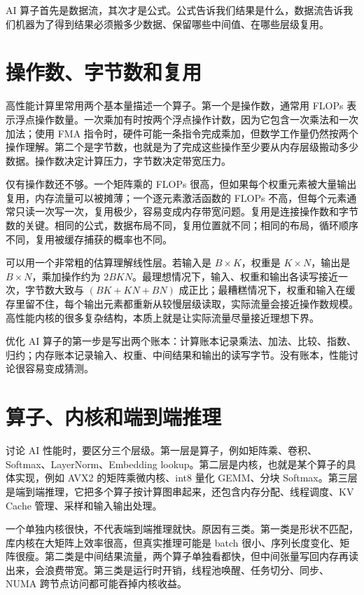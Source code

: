 \begin{mentalmodel}
AI 算子首先是数据流，其次才是公式。公式告诉我们结果是什么，数据流告诉我们机器为了得到结果必须搬多少数据、保留哪些中间值、在哪些层级复用。
\end{mentalmodel}

\section{操作数、字节数和复用}

高性能计算里常用两个基本量描述一个算子。第一个是操作数，通常用 FLOPs 表示浮点操作数量。一次乘加有时按两个浮点操作计数，因为它包含一次乘法和一次加法；使用 FMA 指令时，硬件可能一条指令完成乘加，但数学工作量仍然按两个操作理解。第二个是字节数，也就是为了完成这些操作至少要从内存层级搬动多少数据。操作数决定计算压力，字节数决定带宽压力。

仅有操作数还不够。一个矩阵乘的 FLOPs 很高，但如果每个权重元素被大量输出复用，内存流量可以被摊薄；一个逐元素激活函数的 FLOPs 不高，但每个元素通常只读一次写一次，复用极少，容易变成内存带宽问题。复用是连接操作数和字节数的关键。相同的公式，数据布局不同，复用位置就不同；相同的布局，循环顺序不同，复用被缓存捕获的概率也不同。

可以用一个非常粗的估算理解线性层。若输入是 $B \times K$，权重是 $K \times N$，输出是 $B \times N$，乘加操作约为 $2BKN$。最理想情况下，输入、权重和输出各读写接近一次，字节数大致与 $(BK + KN + BN)$ 成正比；最糟糕情况下，权重和输入在缓存里留不住，每个输出元素都重新从较慢层级读取，实际流量会接近操作数规模。高性能内核的很多复杂结构，本质上就是让实际流量尽量接近理想下界。

\begin{keyidea}
优化 AI 算子的第一步是写出两个账本：计算账本记录乘法、加法、比较、指数、归约；内存账本记录输入、权重、中间结果和输出的读写字节。没有账本，性能讨论很容易变成猜测。
\end{keyidea}

\section{算子、内核和端到端推理}

讨论 AI 性能时，要区分三个层级。第一层是算子，例如矩阵乘、卷积、Softmax、LayerNorm、Embedding lookup。第二层是内核，也就是某个算子的具体实现，例如 AVX2 的矩阵乘微内核、int8 量化 GEMM、分块 Softmax。第三层是端到端推理，它把多个算子按计算图串起来，还包含内存分配、线程调度、KV Cache 管理、采样和输入输出处理。

一个单独内核很快，不代表端到端推理就快。原因有三类。第一类是形状不匹配，库内核在大矩阵上效率很高，但真实推理可能是 batch 很小、序列长度变化、矩阵很瘦。第二类是中间结果流量，两个算子单独看都快，但中间张量写回内存再读出来，会浪费带宽。第三类是运行时开销，线程池唤醒、任务切分、同步、NUMA 跨节点访问都可能吞掉内核收益。

